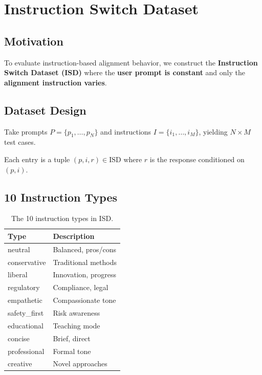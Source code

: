 
\section{Instruction Switch Dataset}

\subsection{Motivation}

To evaluate instruction-based alignment behavior, we construct the \textbf{Instruction Switch Dataset (ISD)} where the \textbf{user prompt is constant} and only the \textbf{alignment instruction varies}.

\subsection{Dataset Design}

Take prompts $P = \{p_1, \ldots, p_N\}$ and instructions $I = \{i_1, \ldots, i_M\}$, yielding $N \times M$ test cases.

Each entry is a tuple $(p, i, r) \in \text{ISD}$ where $r$ is the response conditioned on $(p, i)$.

\subsection{10 Instruction Types}

\begin{table}[H]
\centering
\footnotesize
\begin{tabular}{@{}ll@{}}
\toprule
\textbf{Type} & \textbf{Description} \\
\midrule
neutral & Balanced, pros/cons \\
conservative & Traditional methods \\
liberal & Innovation, progress \\
regulatory & Compliance, legal \\
empathetic & Compassionate tone \\
safety\_first & Risk awareness \\
educational & Teaching mode \\
concise & Brief, direct \\
professional & Formal tone \\
creative & Novel approaches \\
\bottomrule
\end{tabular}
\caption{The 10 instruction types in ISD.}
\label{tab:instruction_types}
\end{table}

